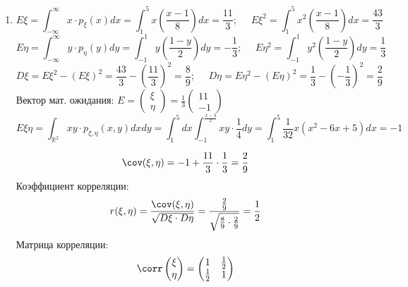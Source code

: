 \begin{enumerate}
	\item
	\[ E\xi = \int_{-\infty}^{\infty} x \cdot p_{\xi} (x) dx = \int_{1}^{5} x \left( \frac{x-1}{8} \right) dx = \frac{11}{3}; ~~~~~~ E\xi^2 = \int_{1}^{5} x^2 \left( \frac{x-1}{8} \right) dx = \frac{43}{3} \]
	\[ E\eta = \int_{-\infty}^{\infty} y \cdot p_{\eta} (y) dy = \int_{-1}^{1} y \left( \frac{1-y}{2} \right) dy = -\frac{1}{3}; ~~~~~~ E\eta^2 = \int_{-1}^{1} y^2 \left( \frac{1-y}{2} \right) dy = \frac{1}{3} \]
	\[ D\xi = E\xi^2 - (E\xi)^2 = \frac{43}{3} - \left(\frac{11}{3}\right)^2 = \frac{8}{9}; ~~~~~~ D\eta = E\eta^2 - (E\eta)^2 = \frac{1}{3} - \left(- \frac{1}{3}\right)^2 = \frac{2}{9} \]
	Вектор мат. ожидания: $E = \begin{pmatrix} \xi \\ \eta \end{pmatrix} = \frac{1}{3} \begin{pmatrix} 11 \\ -1 \end{pmatrix}$
	\[ E\xi\eta = \int_{\mathbb{R}^2} xy \cdot p_{\xi, \eta} (x,y) dxdy = \int_{1}^{5} dx \int_{-1}^{\frac{x-3}{2}} xy \cdot \frac{1}{4} dy = \int_{1}^{5} \frac{1}{32} x (x^2-6x+5) dx = -1 \]
	\begin{center}
		\qquad
	\end{center}
	\[ \cov (\xi, \eta) = -1 + \frac{11}{3} \cdot \frac{1}{3} = \frac{2}{9} \]
	Коэффициент корреляции:
	\[ r(\xi, \eta) = \frac{\cov (\xi, \eta)}{\sqrt{D\xi \cdot D\eta}} = \frac{\frac{2}{9}}{\sqrt{\frac{8}{9} \cdot \frac{2}{9}}} = \frac{1}{2} \]
	Матрица корреляции:
	\[ \corr \begin{pmatrix} \xi \\ \eta \end{pmatrix} = \begin{pmatrix} 1 & \frac{1}{2} \\ \frac{1}{2} & 1 \end{pmatrix} \]

\end{enumerate}
